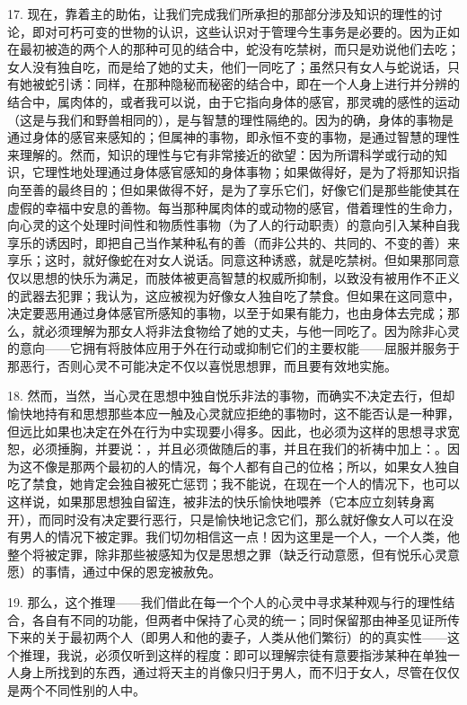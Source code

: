 17. 现在，靠着主的助佑，让我们完成我们所承担的那部分涉及知识的理性的讨论，即对可朽可变的世物的认识，这些认识对于管理今生事务是必要的。因为正如在最初被造的两个人的那种可见的结合中，蛇没有吃禁树，而只是劝说他们去吃；女人没有独自吃，而是给了她的丈夫，他们一同吃了；虽然只有女人与蛇说话，只有她被蛇引诱：同样，在那种隐秘而秘密的结合中，即在一个人身上进行并分辨的结合中，属肉体的，或者我可以说，由于它指向身体的感官，那灵魂的感性的运动（这是与我们和野兽相同的），是与智慧的理性隔绝的。因为的确，身体的事物是通过身体的感官来感知的；但属神的事物，即永恒不变的事物，是通过智慧的理性来理解的。然而，知识的理性与它有非常接近的欲望：因为所谓科学或行动的知识，它理性地处理通过身体感官感知的身体事物；如果做得好，是为了将那知识指向至善的最终目的；但如果做得不好，是为了享乐它们，好像它们是那些能使其在虚假的幸福中安息的善物。每当那种属肉体的或动物的感官，借着理性的生命力，向心灵的这个处理时间性和物质性事物（为了人的行动职责）的意向引入某种自我享乐的诱因时，即把自己当作某种私有的善（而非公共的、共同的、不变的善）来享乐；这时，就好像蛇在对女人说话。同意这种诱惑，就是吃禁树。但如果那同意仅以思想的快乐为满足，而肢体被更高智慧的权威所抑制，以致没有被用作不正义的武器去犯罪；我认为，这应被视为好像女人独自吃了禁食。但如果在这同意中，决定要恶用通过身体感官所感知的事物，以至于如果有能力，也由身体去完成；那么，就必须理解为那女人将非法食物给了她的丈夫，与他一同吃了。因为除非心灵的意向——它拥有将肢体应用于外在行动或抑制它们的主要权能——屈服并服务于那恶行，否则心灵不可能决定不仅以喜悦思想罪，而且要有效地实施。\par

18. 然而，当然，当心灵在思想中独自悦乐非法的事物，而确实不决定去行，但却愉快地持有和思想那些本应一触及心灵就应拒绝的事物时，这不能否认是一种罪，但远比如果也决定在外在行为中实现要小得多。因此，也必须为这样的思想寻求宽恕，必须捶胸，并要说：，并且必须做随后的事，并且在我们的祈祷中加上：。因为这不像是那两个最初的人的情况，每个人都有自己的位格；所以，如果女人独自吃了禁食，她肯定会独自被死亡惩罚；我不能说，在现在一个人的情况下，也可以这样说，如果那思想独自留连，被非法的快乐愉快地喂养（它本应立刻转身离开），而同时没有决定要行恶行，只是愉快地记念它们，那么就好像女人可以在没有男人的情况下被定罪。我们切勿相信这一点！因为这里是一个人，一个人类，他整个将被定罪，除非那些被感知为仅是思想之罪（缺乏行动意愿，但有悦乐心灵意愿）的事情，通过中保的恩宠被赦免。\par

19. 那么，这个推理——我们借此在每一个个人的心灵中寻求某种观与行的理性结合，各自有不同的功能，但两者中保持了心灵的统一；同时保留那由神圣见证所传下来的关于最初两个人（即男人和他的妻子，人类从他们繁衍）的的真实性——这个推理，我说，必须仅听到这样的程度：即可以理解宗徒有意要指涉某种在单独一人身上所找到的东西，通过将天主的肖像只归于男人，而不归于女人，尽管在仅仅是两个不同性别的人中。\par

